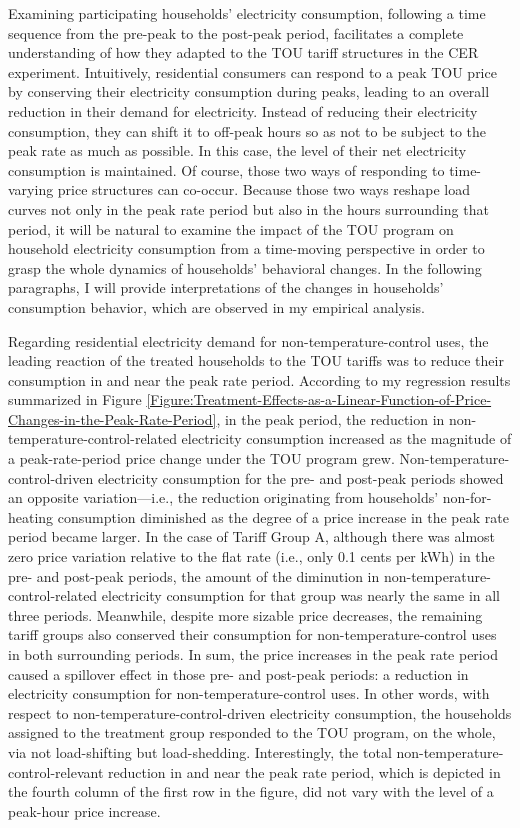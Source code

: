 Examining participating households' electricity consumption, following a time sequence from the pre-peak to the post-peak period, facilitates a complete understanding of how they adapted to the TOU tariff structures in the CER experiment. Intuitively, residential consumers can respond to a peak TOU price by conserving their electricity consumption during peaks, leading to an overall reduction in their demand for electricity. Instead of reducing their electricity consumption, they can shift it to off-peak hours so as not to be subject to the peak rate as much as possible. In this case, the level of their net electricity consumption is maintained. Of course, those two ways of responding to time-varying price structures can co-occur. Because those two ways reshape load curves not only in the peak rate period but also in the hours surrounding that period, it will be natural to examine the impact of the TOU program on household electricity consumption from a time-moving perspective in order to grasp the whole dynamics of households' behavioral changes. In the following paragraphs, I will provide interpretations of the changes in households' consumption behavior, which are observed in my empirical analysis. 

Regarding residential electricity demand for non-temperature-control uses, the leading reaction of the treated households to the TOU tariffs was to reduce their consumption in and near the peak rate period. According to my regression results summarized in Figure \ref{Figure:Treatment-Effects-as-a-Linear-Function-of-Price-Changes-in-the-Peak-Rate-Period}, in the peak period, the reduction in non-temperature-control-related electricity consumption increased as the magnitude of a peak-rate-period price change under the TOU program grew. Non-temperature-control-driven electricity consumption for the pre- and post-peak periods showed an opposite variation---i.e., the reduction originating from households' non-for-heating consumption diminished as the degree of a price increase in the peak rate period became larger. In the case of Tariff Group A, although there was almost zero price variation relative to the flat rate (i.e., only 0.1 cents per kWh) in the pre- and post-peak periods, the amount of the diminution in non-temperature-control-related electricity consumption for that group was nearly the same in all three periods. Meanwhile, despite more sizable price decreases, the remaining tariff groups also conserved their consumption for non-temperature-control uses in both surrounding periods. In sum, the price increases in the peak rate period caused a spillover effect in those pre- and post-peak periods: a reduction in electricity consumption for non-temperature-control uses. In other words, with respect to non-temperature-control-driven electricity consumption, the households assigned to the treatment group responded to the TOU program, on the whole, via not load-shifting but load-shedding. Interestingly, the total non-temperature-control-relevant reduction in and near the peak rate period, which is depicted in the fourth column of the first row in the figure, did not vary with the level of a peak-hour price increase. 

